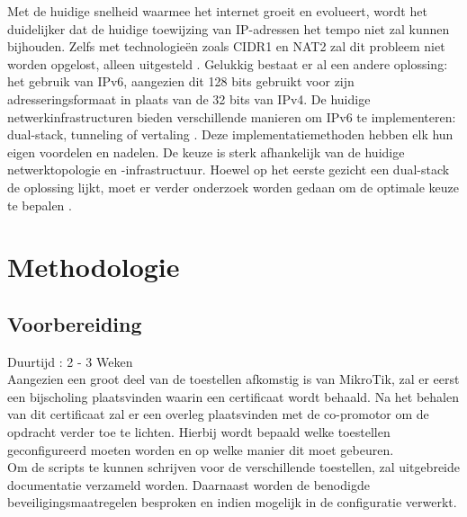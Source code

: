 Met de huidige snelheid waarmee het internet groeit en evolueert, wordt het duidelijker dat de huidige toewijzing van IP-adressen het tempo niet zal kunnen bijhouden. 
Zelfs met technologieën zoals CIDR1 en NAT2 zal dit probleem niet worden opgelost, alleen uitgesteld \autocite{Gu2005}.
Gelukkig bestaat er al een andere oplossing: het gebruik van IPv6, aangezien dit 128 bits gebruikt voor zijn adresseringsformaat in plaats van de 32 bits van IPv4. 
De huidige netwerkinfrastructuren bieden verschillende manieren om IPv6 te implementeren: dual-stack, tunneling of vertaling \autocite{Zunainah2021}. 
Deze implementatiemethoden hebben elk hun eigen voordelen en nadelen. De keuze is sterk afhankelijk van de huidige netwerktopologie en -infrastructuur. 
Hoewel op het eerste gezicht een dual-stack de oplossing lijkt, moet er verder onderzoek worden gedaan om de optimale keuze te bepalen \autocite{Zehl2001}.


\section{Methodologie}%
\label{sec:methodologie}

\subsection{Voorbereiding}
\label{sec:voorbereiding}
{\small Duurtijd : 2 - 3 Weken}\\

Aangezien een groot deel van de toestellen afkomstig is van MikroTik, zal er eerst een bijscholing plaatsvinden waarin een certificaat wordt behaald. 
Na het behalen van dit certificaat zal er een overleg plaatsvinden met de co-promotor om de opdracht verder toe te lichten. 
Hierbij wordt bepaald welke toestellen geconfigureerd moeten worden en op welke manier dit moet gebeuren.\\

Om de scripts te kunnen schrijven voor de verschillende toestellen, zal uitgebreide documentatie verzameld worden. 
Daarnaast worden de benodigde beveiligingsmaatregelen besproken en indien mogelijk in de configuratie verwerkt.\\

